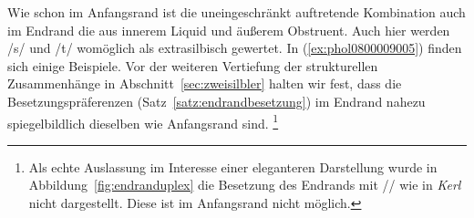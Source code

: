 \begin{exe}
  \ex \label{ex:phol0800009004}
  \begin{xlist}
  \end{xlist}
\end{exe}

Wie schon im Anfangsrand ist die uneingeschränkt auftretende Kombination auch im Endrand die aus innerem Liquid und äußerem Obstruent.
Auch hier werden /s/ und /t/ womöglich als extrasilbisch gewertet.
In (\ref{ex:phol0800009005}) finden sich einige Beispiele.
Vor der weiteren Vertiefung der strukturellen Zusammenhänge in Abschnitt~\ref{sec:zweisilbler} halten wir fest, dass die Besetzungspräferenzen (Satz~\ref{satz:endrandbesetzung}) im Endrand nahezu spiegelbildlich dieselben wie Anfangsrand sind.%
\footnote{Als echte Auslassung im Interesse einer eleganteren Darstellung wurde in Abbildung~\ref{fig:endranduplex} die Besetzung des Endrands mit // wie in \textit{Kerl} nicht dargestellt.
Diese ist im Anfangsrand nicht möglich.}

\begin{exe}
  \ex \label{ex:phol0800009005}
  \begin{xlist}
  \end{xlist}
\end{exe}


